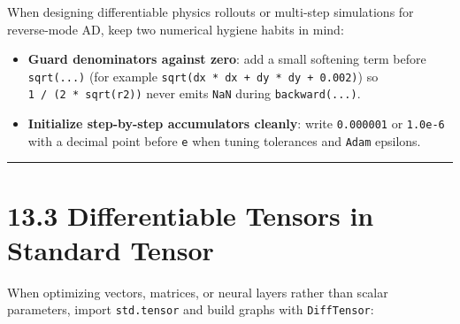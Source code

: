 \documentclass[
  english,
  oneside]{book}
\providecommand{\tightlist}{%
  \setlength{\itemsep}{0pt}\setlength{\parskip}{0pt}}
\begin{document}
When designing differentiable physics rollouts or multi-step simulations
for reverse-mode AD, keep two numerical hygiene habits in mind:

\begin{itemize}
\tightlist
\item
  \textbf{Guard denominators against zero}: add a small softening term
  before \texttt{sqrt(...)} (for example
  \texttt{sqrt(dx\ *\ dx\ +\ dy\ *\ dy\ +\ 0.002)}) so
  \texttt{1\ /\ (2\ *\ sqrt(r2))} never emits \texttt{NaN} during
  \texttt{backward(...)}.
\item
  \textbf{Initialize step-by-step accumulators cleanly}: write
  \texttt{0.000001} or \texttt{1.0e-6} with a decimal point before
  \texttt{e} when tuning tolerances and \texttt{Adam} epsilons.
\end{itemize}

\begin{center}\rule{0.5\linewidth}{0.5pt}\end{center}

\section{13.3 Differentiable Tensors in Standard
Tensor}\label{differentiable-tensors-in-standard-tensor}

When optimizing vectors, matrices, or neural layers rather than scalar
parameters, import \texttt{std.tensor} and build graphs with
\texttt{DiffTensor}:
\end{document}
